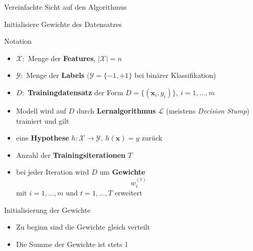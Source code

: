 \documentclass[hyperref={bookmarks=false},11pt,dvipsnames]{beamer}
\begin{document}
\begin{frame}{Vereinfachte Sicht auf den Algorithmus}
	\begin{algorithm}[H]
		\DontPrintSemicolon
		\LinesNotNumbered
		\BlankLine
		Initialisiere Gewichte des Datensatzes\;
	\end{algorithm}
\end{frame}

\begin{frame}[t]{Notation}
	\begin{itemize}
		\item <1-> $\mathcal{X}:$ Menge der \textbf{Features}, $|\mathcal{X}|=n$
		\item <2-> $\mathcal{Y}:$ Menge der \textbf{Labels} $(\mathcal{Y}=\{-1,+1\}$ bei binärer Klassifikation)
		\item <3-> $D:$ \textbf{Trainingdatensatz} der Form $D=\{(\boldsymbol{x}_i,y_i)\},~i=1,...,m$
		\item <4-> Modell wird auf $D$ durch \textbf{Lernalgorithmus} $\mathcal{L}$ (meistens \emph{Decision Stump}) trainiert und gilt
		\item <5-> eine \textbf{Hypothese} $h:\mathcal{X}\rightarrow\mathcal{Y},~h(\boldsymbol{x})=y$ zurück
		\item <6-> Anzahl der \textbf{Trainingsiterationen} $T$
		\item <7-> bei jeder Iteration wird $D$ um \textbf{Gewichte} $$w^{(t)}_i$$ mit $i=1,\dots,m$ und $t=1,\dots,T$ erweitert
	\end{itemize}
\end{frame}

\begin{frame}[t]{Initialisierung der Gewichte}
	\begin{itemize}
		\item <1-> Zu beginn sind die Gewichte gleich verteilt 
		\item <2-> Die Summe der Gewichte ist stets 1 
	\end{itemize}
\end{frame}
\end{document}
